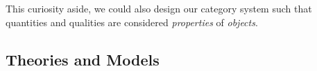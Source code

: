 This curiosity aside, we could also design our category system such that quantities and qualities are considered \textit{properties} of \textit{objects}. 



\subsection{Theories and Models}


